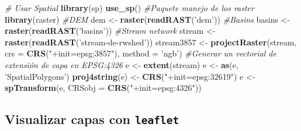 \documentclass[11pt,]{article}
\newenvironment{Shaded}{\begin{snugshade}}{\end{snugshade}}
\newcommand{\KeywordTok}[1]{\textcolor[rgb]{0.13,0.29,0.53}{\textbf{#1}}}
\newcommand{\DataTypeTok}[1]{\textcolor[rgb]{0.13,0.29,0.53}{#1}}
\newcommand{\StringTok}[1]{\textcolor[rgb]{0.31,0.60,0.02}{#1}}
\newcommand{\CommentTok}[1]{\textcolor[rgb]{0.56,0.35,0.01}{\textit{#1}}}
\newcommand{\NormalTok}[1]{#1}
\begin{document}
\begin{Shaded}
\begin{Highlighting}[]
\CommentTok{# Usar Spatial }
\KeywordTok{library}\NormalTok{(sp)}
\KeywordTok{use_sp}\NormalTok{()}
\CommentTok{#Paquete manejo de los raster}
\KeywordTok{library}\NormalTok{(raster)}
\CommentTok{#DEM}
\NormalTok{dem <-}\StringTok{ }\KeywordTok{raster}\NormalTok{(}\KeywordTok{readRAST}\NormalTok{(}\StringTok{'dem'}\NormalTok{))}
\CommentTok{#Basins}
\NormalTok{basins <-}\StringTok{ }\KeywordTok{raster}\NormalTok{(}\KeywordTok{readRAST}\NormalTok{(}\StringTok{'basins'}\NormalTok{))}
\CommentTok{#Stream network}
\NormalTok{stream <-}\StringTok{ }\KeywordTok{raster}\NormalTok{(}\KeywordTok{readRAST}\NormalTok{(}\StringTok{'stream-de-rwshed'}\NormalTok{))}
\NormalTok{stream3857 <-}\StringTok{ }\KeywordTok{projectRaster}\NormalTok{(stream, }\DataTypeTok{crs =} \KeywordTok{CRS}\NormalTok{(}\StringTok{"+init=epsg:3857"}\NormalTok{), }\DataTypeTok{method =} \StringTok{'ngb'}\NormalTok{)}
\CommentTok{#Generar un vectorial de extensión de capa en EPSG:4326}
\NormalTok{e <-}\StringTok{ }\KeywordTok{extent}\NormalTok{(stream)}
\NormalTok{e <-}\StringTok{ }\KeywordTok{as}\NormalTok{(e, }\StringTok{'SpatialPolygons'}\NormalTok{)}
\KeywordTok{proj4string}\NormalTok{(e) <-}\StringTok{ }\KeywordTok{CRS}\NormalTok{(}\StringTok{"+init=epsg:32619"}\NormalTok{)}
\NormalTok{e <-}\StringTok{ }\KeywordTok{spTransform}\NormalTok{(e, }\DataTypeTok{CRSobj =} \KeywordTok{CRS}\NormalTok{(}\StringTok{"+init=epsg:4326"}\NormalTok{))}
\end{Highlighting}
\end{Shaded}

\subsection{\texorpdfstring{Visualizar capas con
\texttt{leaflet}}{Visualizar capas con leaflet}}\label{visualizar-capas-con-leaflet}
\end{document}
